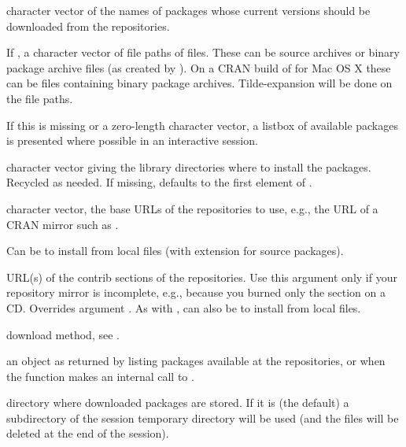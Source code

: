 \begin{Arguments}
\begin{ldescription}
\item[\code{pkgs}] character vector of the names of packages whose
current versions should be downloaded from the repositories.

If , a character vector of file paths of
 files.  These can be source archives or binary
package archive files (as created by ).
On a CRAN build of \R{} for Mac OS X these can be  files
containing binary package archives.
Tilde-expansion will be done on the file paths.

If this is missing or a zero-length character vector, a listbox of
available packages is presented where possible in an interactive \R{}
session.

\item[\code{lib}] 
character vector giving the library directories where to
install the packages.  Recycled as needed.  If missing, defaults to
the first element of .

\item[\code{repos}] 
character vector, the base URLs of the repositories
to use, e.g., the URL of a CRAN mirror such as
.

Can be  to install from local files
(with extension  for source packages).

\item[\code{contriburl}] 
URL(s) of the contrib sections of the repositories.  Use this
argument only if your repository mirror is incomplete, e.g., because
you burned only the  section on a CD.  Overrides
argument .  As with , can also be 
to install from local files.

\item[\code{method}] 
download method, see .

\item[\code{available}] 
an object as returned by 
listing packages available at the repositories, or  when
the function makes an internal call to .

\item[\code{destdir}] 
directory where downloaded packages are stored.  If it is
 (the default) a subdirectory
 of the session temporary
directory will be used (and the files will be deleted
at the end of the session). 


\end{ldescription}
\end{Arguments}
